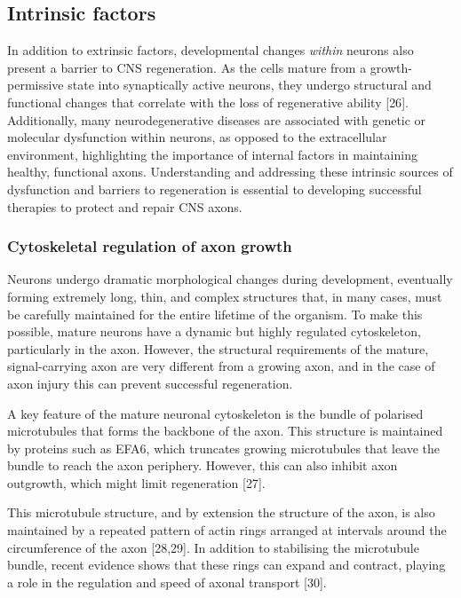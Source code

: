 \documentclass[
  12pt,
  a4paper,
]{book}
\begin{document}
\hypertarget{intrinsic-factors}{%
\subsection{Intrinsic factors}\label{intrinsic-factors}}

In addition to extrinsic factors, developmental changes \emph{within} neurons also present a barrier to CNS regeneration. As the cells mature from a growth-permissive state into synaptically active neurons, they undergo structural and functional changes that correlate with the loss of regenerative ability {[}26{]}. Additionally, many neurodegenerative diseases are associated with genetic or molecular dysfunction within neurons, as opposed to the extracellular environment, highlighting the importance of internal factors in maintaining healthy, functional axons. Understanding and addressing these intrinsic sources of dysfunction and barriers to regeneration is essential to developing successful therapies to protect and repair CNS axons.

\hypertarget{cytoskeletal-regulation-of-axon-growth}{%
\subsubsection{Cytoskeletal regulation of axon growth}\label{cytoskeletal-regulation-of-axon-growth}}

Neurons undergo dramatic morphological changes during development, eventually forming extremely long, thin, and complex structures that, in many cases, must be carefully maintained for the entire lifetime of the organism. To make this possible, mature neurons have a dynamic but highly regulated cytoskeleton, particularly in the axon. However, the structural requirements of the mature, signal-carrying axon are very different from a growing axon, and in the case of axon injury this can prevent successful regeneration.

A key feature of the mature neuronal cytoskeleton is the bundle of polarised microtubules that forms the backbone of the axon. This structure is maintained by proteins such as EFA6, which truncates growing microtubules that leave the bundle to reach the axon periphery. However, this can also inhibit axon outgrowth, which might limit regeneration {[}27{]}.

This microtubule structure, and by extension the structure of the axon, is also maintained by a repeated pattern of actin rings arranged at intervals around the circumference of the axon {[}28,29{]}. In addition to stabilising the microtubule bundle, recent evidence shows that these rings can expand and contract, playing a role in the regulation and speed of axonal transport {[}30{]}.
\end{document}
